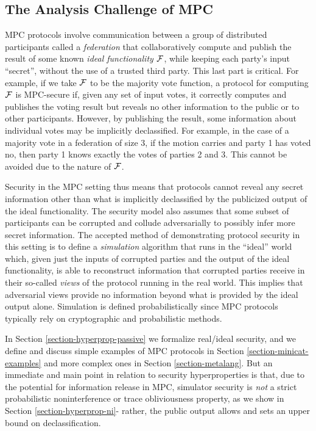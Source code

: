 \subsection{The Analysis Challenge of MPC}
MPC protocols involve communication
between a group of distributed participants called a \emph{federation}
that collaboratively compute and publish the result of some known
\emph{ideal functionality} $\mathcal{F}$, while keeping each party's input
``secret'', without the use of a trusted third party. This last part
is critical. For example, if we take $\mathcal{F}$ to be the majority vote
function, a protocol for computing $\mathcal{F}$ is MPC-secure if, given
any set of input votes, it correctly computes and publishes the voting
result but reveals no other information to the public or to other
participants. However, by publishing the result, some information
about individual votes may be implicitly declassified.  For example,
in the case of a majority vote in a federation of size 3, if the
motion carries and party 1 has voted no, then party 1 knows exactly
the votes of parties 2 and 3. This cannot be avoided due to the nature
of $\mathcal{F}$.

Security in the MPC setting thus means that protocols cannot reveal
any secret information other than what is implicitly declassified by
the publicized output of the ideal functionality. The security model
also assumes that some subset of participants can be corrupted and
collude adversarially to possibly infer more secret information. The
accepted method of demonstrating protocol security in this setting is
to define a \emph{simulation} algorithm that runs in the ``ideal''
world which, given just the inputs of corrupted parties and the output
of the ideal functionality, is able to reconstruct information that
corrupted parties receive in their so-called \emph{views} of the
protocol running in the real world.  This implies that adversarial
views provide no information beyond what is provided by the ideal
output alone. Simulation is defined probabilistically since MPC
protocols typically rely on cryptographic and probabilistic methods.

In Section \ref{section-hyperprop-passive} we formalize real/ideal
security, and we define and discuss simple examples of MPC protocols
in Section \ref{section-minicat-examples} and more complex ones in
Section \ref{section-metalang}. But an immediate and main point in
relation to security hyperproperties is that, due to the potential for
information release in MPC, simulator security is \emph{not} a strict
probabilistic noninterference or trace obliviousness property, as we
show in Section \ref{section-hyperprop-ni}- rather, the public output
allows and sets an upper bound on declassification.

